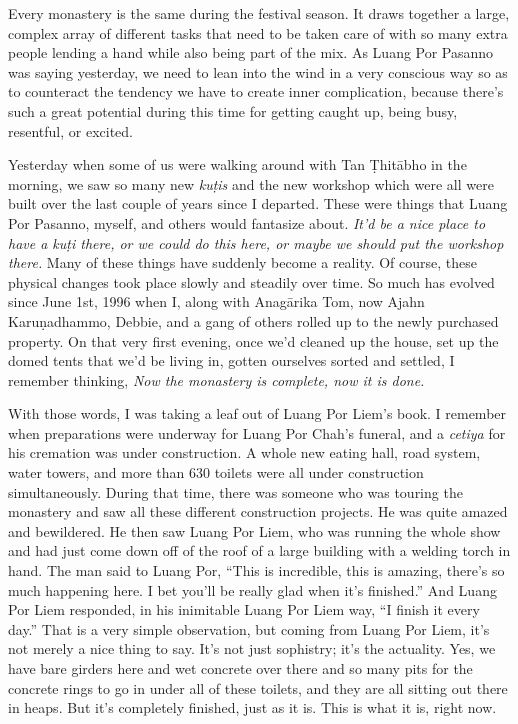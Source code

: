 Every monastery is the same during the festival season. It draws 
together a large, complex array of different tasks that need to be 
taken care of with so many extra people lending a hand while also being 
part of the mix. As Luang Por Pasanno was saying yesterday, we need to 
lean into the wind in a very conscious way so as to counteract the 
tendency we have to create inner complication, because there's such a 
great potential during this time for getting caught up, being busy, 
resentful, or excited.

Yesterday when some of us were walking around with Tan Ṭhitābho in 
the morning, we saw so many new \emph{kuṭis} and the new workshop 
which were all were built over the last couple of years since I 
departed. These were things that Luang Por Pasanno, myself, and others 
would fantasize about. \emph{It'd be a nice place to have a kuṭi 
there, or we could do this here, or maybe we should put the workshop 
there.} Many of these things have suddenly become a reality. Of course, 
these physical changes took place slowly and steadily over time. So 
much has evolved since June 1st, 1996 when I, along with Anagārika 
Tom, now Ajahn Karuṇadhammo, Debbie, and a gang of others rolled up 
to the newly purchased property. On that very first evening, once we'd 
cleaned up the house, set up the domed tents that we'd be living in, 
gotten ourselves sorted and settled, I remember thinking, \emph{Now the 
monastery is complete, now it is done.}

With those words, I was taking a leaf out of Luang Por Liem's book. I 
remember when preparations were underway for Luang Por Chah's funeral, 
and a \emph{cetiya} for his cremation was under construction. A whole 
new eating hall, road system, water towers, and more than 630 toilets 
were all under construction simultaneously. During that time, there was 
someone who was touring the monastery and saw all these different 
construction projects. He was quite amazed and bewildered. He then saw 
Luang Por Liem, who was running the whole show and had just come down 
off of the roof of a large building with a welding torch in hand. The 
man said to Luang Por, ``This is incredible, this is amazing, there's 
so much happening here. I bet you'll be really glad when it's 
finished.'' And Luang Por Liem responded, in his inimitable Luang Por 
Liem way, ``I finish it every day.'' That is a very simple observation, 
but coming from Luang Por Liem, it's not merely a nice thing to say. 
It's not just sophistry; it's the actuality. Yes, we have bare girders 
here and wet concrete over there and so many pits for the concrete 
rings to go in under all of these toilets, and they are all sitting out 
there in heaps. But it's completely finished, just as it is. This is 
what it is, right now.

